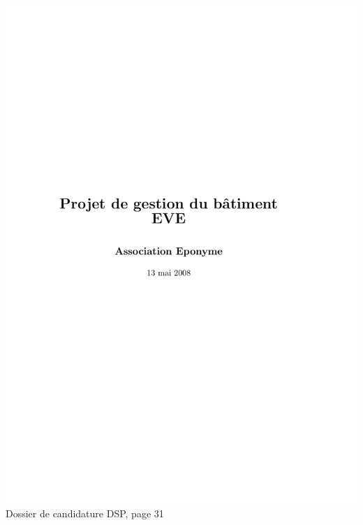 \includegraphics[scale=0.85,trim=20mm 20mm 20mm 20mm,clip,page=31]{annexes/candidature_dsp.pdf} \\
Dossier de candidature DSP, page 31
\newpage
